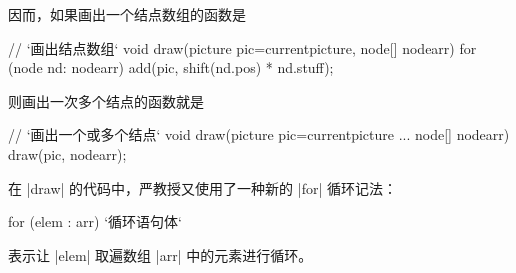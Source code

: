 因而，如果画出一个结点数组的函数是
\begin{asycode}
// `\color{comment}画出结点数组`
void draw(picture pic=currentpicture, node[] nodearr)
{
    for (node nd: nodearr)
        add(pic, shift(nd.pos) * nd.stuff);
}
\end{asycode}
则画出一次多个结点的函数就是
\begin{asycode}
// `\color{comment}画出一个或多个结点`
void draw(picture pic=currentpicture ... node[] nodearr)
{
    draw(pic, nodearr);
}
\end{asycode}
在 |draw| 的代码中，严教授又使用了一种新的 |for| 循环记法：
\begin{asycode}
for (elem : arr)
    `循环语句体`
\end{asycode}
表示让 |elem| 取遍数组 |arr| 中的元素进行循环。

